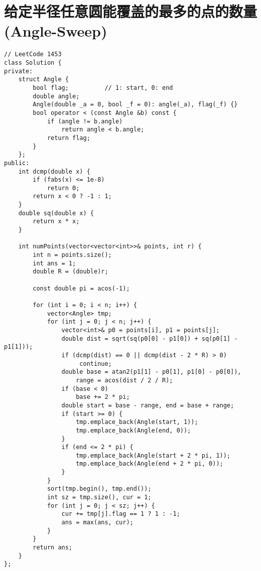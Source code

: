 \section{给定半径任意圆能覆盖的最多的点的数量 (Angle-Sweep)}
\begin{verbatim}
// LeetCode 1453
class Solution {
private:
    struct Angle {
        bool flag;          // 1: start, 0: end
        double angle;
        Angle(double _a = 0, bool _f = 0): angle(_a), flag(_f) {}
        bool operator < (const Angle &b) const {
            if (angle != b.angle)
                return angle < b.angle;
            return flag;
        }
    };
public:
    int dcmp(double x) {
        if (fabs(x) <= 1e-8)
            return 0;
        return x < 0 ? -1 : 1;
    }
    double sq(double x) {
        return x * x;
    }

    int numPoints(vector<vector<int>>& points, int r) {
        int n = points.size();
        int ans = 1;
        double R = (double)r;

        const double pi = acos(-1);

        for (int i = 0; i < n; i++) {
            vector<Angle> tmp;
            for (int j = 0; j < n; j++) {
                vector<int>& p0 = points[i], p1 = points[j];
                double dist = sqrt(sq(p0[0] - p1[0]) + sq(p0[1] - p1[1]));
                if (dcmp(dist) == 0 || dcmp(dist - 2 * R) > 0)
                     continue;
                double base = atan2(p1[1] - p0[1], p1[0] - p0[0]),
                    range = acos(dist / 2 / R);
                if (base < 0)
                    base += 2 * pi;
                double start = base - range, end = base + range;
                if (start >= 0) {
                    tmp.emplace_back(Angle(start, 1));
                    tmp.emplace_back(Angle(end, 0));
                }
                if (end <= 2 * pi) {
                    tmp.emplace_back(Angle(start + 2 * pi, 1));
                    tmp.emplace_back(Angle(end + 2 * pi, 0));
                }
            }
            sort(tmp.begin(), tmp.end());
            int sz = tmp.size(), cur = 1;
            for (int j = 0; j < sz; j++) {
                cur += tmp[j].flag == 1 ? 1 : -1;
                ans = max(ans, cur);
            }
        }
        return ans;
    }
};
\end{verbatim}
